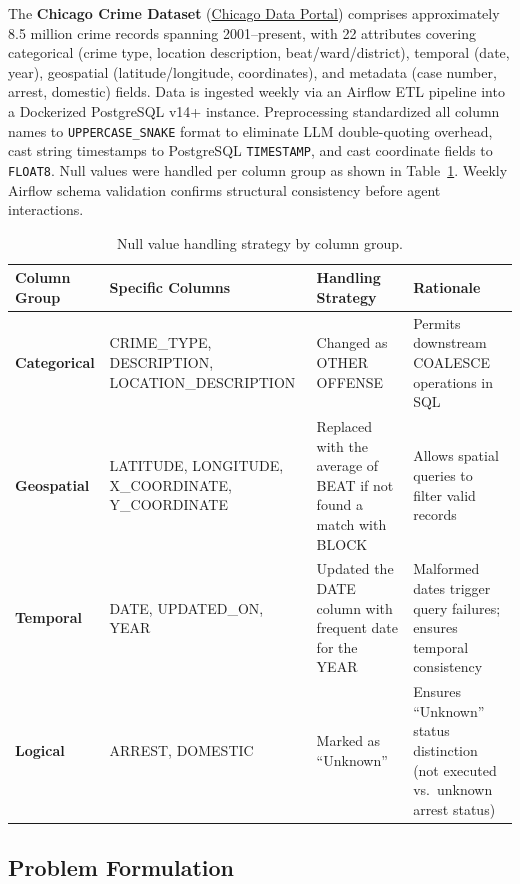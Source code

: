 \documentclass{article}
\begin{document}
The \textbf{Chicago Crime Dataset} (\href{https://data.cityofchicago.org/Public-Safety/Crimes-2001-to-Present/ijzp-q8t2}{Chicago Data Portal}) comprises approximately 8.5 million crime records spanning 2001--present, with 22 attributes covering categorical (crime type, location description, beat/ward/district), temporal (date, year), geospatial (latitude/longitude, coordinates), and metadata (case number, arrest, domestic) fields. Data is ingested weekly via an Airflow ETL pipeline into a Dockerized PostgreSQL v14+ instance. Preprocessing standardized all column names to \texttt{UPPERCASE\_SNAKE} format to eliminate LLM double-quoting overhead, cast string timestamps to PostgreSQL \texttt{TIMESTAMP}, and cast coordinate fields to \texttt{FLOAT8}. Null values were handled per column group as shown in Table~\ref{tab:null_handling}. Weekly Airflow schema validation confirms structural consistency before agent interactions.

\begin{table}[h]
    \centering
    \small
    \begin{tabularx}{\textwidth}{|l|X|X|X|}
        \hline
        \textbf{Column Group} & \textbf{Specific Columns} & \textbf{Handling Strategy} & \textbf{Rationale} \\ \hline
        \textbf{Categorical} & CRIME\_TYPE, DESCRIPTION, LOCATION\_DESCRIPTION & Changed as OTHER OFFENSE & Permits downstream COALESCE operations in SQL\\ \hline
        \textbf{Geospatial} & LATITUDE, LONGITUDE, X\_COORDINATE, Y\_COORDINATE & Replaced with the average of BEAT if not found a match with BLOCK & Allows spatial queries to filter valid records \\ \hline
        \textbf{Temporal} & DATE, UPDATED\_ON, YEAR & Updated the DATE column with frequent date for the YEAR & Malformed dates trigger query failures; ensures temporal consistency \\ \hline
        \textbf{Logical} & ARREST, DOMESTIC & Marked as ``Unknown'' & Ensures ``Unknown'' status distinction (not executed vs.\ unknown arrest status) \\ \hline
    \end{tabularx}
    \caption{Null value handling strategy by column group.}
    \label{tab:null_handling}
\end{table}

\subsection{Problem Formulation}
\end{document}
